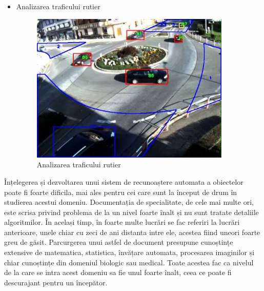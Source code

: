 \begin{itemize}
	\item Analizarea traficului rutier	
	\begin{figure}[H]
		\centering
			\includegraphics[width=0.9\textwidth]{imagini/traffic_analisys.jpg}
		\caption{Analizarea traficului rutier\protect\footnotemark}
		\label{fig:traffic_analisys}
	\end{figure}

\end{itemize}

Înțelegerea și dezvoltarea unui sistem de recunoaștere automata a obiectelor poate fi foarte dificila, mai ales pentru cei care sunt la început de drum în studierea acestui domeniu. 
Documentația de specialitate, de cele mai multe ori, este scrisa privind problema de la un nivel foarte înalt și nu sunt tratate detaliile algoritmilor. 
În același timp, în foarte multe lucrări se fac referiri la lucrări anterioare, unele chiar cu zeci de ani distanta intre ele, acestea fiind uneori foarte greu de găsit.
Parcurgerea unui astfel de document presupune cunoștințe extensive de matematica, statistica, învățare automata, procesarea imaginilor și chiar cunoștințe din domeniul biologic sau medical. 
Toate acestea fac ca nivelul de la care se intra acest domeniu sa fie unul foarte înalt, ceea ce poate fi descurajant pentru un începător.

